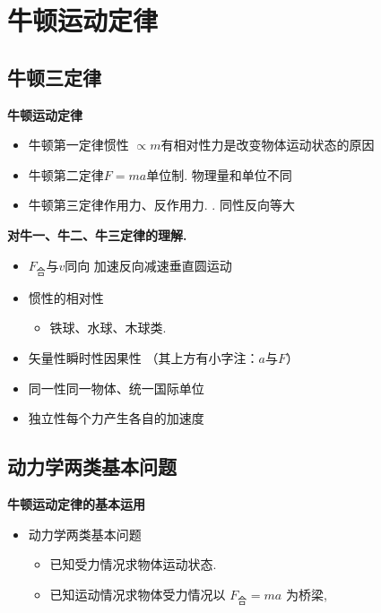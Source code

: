 \chapter{牛顿运动定律}
\label{ch:03}

\section{牛顿三定律}
\textbf{牛顿运动定律}
\begin{itemize}
\item 牛顿第一定律\quad 惯性 $\propto m$\quad 有相对性\quad 力是改变物体运动状态的原因 %
\item 牛顿第二定律\quad $F=ma$\quad 单位制. 物理量和单位不同
\item 牛顿第三定律\quad 作用力、反作用力. . 同性反向等大
\end{itemize}

\textbf{对牛一、牛二、牛三定律的理解.}
\begin{itemize}
\item $F_{\text{合}}$与$v$同向 加速\quad 反向减速\quad 垂直圆运动 %
\item 惯性的相对性
  \begin{itemize}
  \item 铁球、水球、木球类.
  \end{itemize}
\item 矢量性\quad 瞬时性\quad 因果性 \quad （其上方有小字注：$a$与$F$）
\item 同一性\quad 同一物体、统一国际单位
\item 独立性\quad 每个力产生各自的加速度
\end{itemize}


\section{动力学两类基本问题}
\textbf{牛顿运动定律的基本运用}
\begin{itemize}
\item 动力学两类基本问题
  \begin{itemize}
  \item 已知受力情况求物体运动状态.
  \item 已知运动情况求物体受力情况\quad 以 $F_{\text{合}}=ma$ 为桥梁,
  \end{itemize}
\end{itemize}

